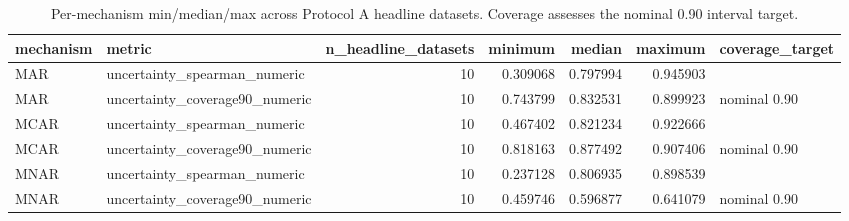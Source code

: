 \begin{table}[ht]
\centering
\caption{Per-mechanism min/median/max across Protocol A headline datasets. Coverage assesses the nominal 0.90 interval target.}
\label{tab:protocol_a_project_mice_uncertainty_summary}
\begin{tabular}{llrrrrl}
\hline
 mechanism   & metric                         &   n\_headline\_datasets &   minimum &   median &   maximum & coverage\_target   \\
\hline
 MAR         & uncertainty\_spearman\_numeric   &                    10 &  0.309068 & 0.797994 &  0.945903 &                   \\
 MAR         & uncertainty\_coverage90\_numeric &                    10 &  0.743799 & 0.832531 &  0.899923 & nominal 0.90      \\
 MCAR        & uncertainty\_spearman\_numeric   &                    10 &  0.467402 & 0.821234 &  0.922666 &                   \\
 MCAR        & uncertainty\_coverage90\_numeric &                    10 &  0.818163 & 0.877492 &  0.907406 & nominal 0.90      \\
 MNAR        & uncertainty\_spearman\_numeric   &                    10 &  0.237128 & 0.806935 &  0.898539 &                   \\
 MNAR        & uncertainty\_coverage90\_numeric &                    10 &  0.459746 & 0.596877 &  0.641079 & nominal 0.90      \\
\hline
\end{tabular}
\end{table}
